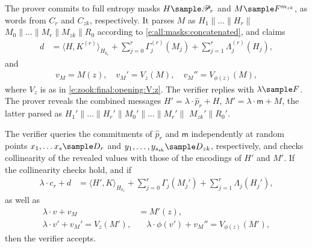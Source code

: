 \begin{protocol}
\label{prot:zook:final:opening}
The prover commits to full entropy masks $H \sample \mathscr P_r$ and $M\sample F^{m_{zk}}$, as words from $C_r$ and $C_{zk}$, respectively.
It parses $M$ as $H_1\|\ldots\|H_r\|$ $M_0 \| \ldots\|M_r\|M_{zk}\|R_0$ according to \eqref{e:all:masks:concatenated}, and claims
\begin{align}
\label{e:zook:claim:H}
d  &= \langle  H, K^{(r)} \rangle_{H_{k_r}}
+ \sum_{j=0}^r \Gamma_j^{(r)}(M_j) + \sum_{j=1}^r \Lambda_j^{(r)}(H_j),
\end{align}
and
\begin{align}
v_{M} = M(z), 
\quad
v_{M}' = V_{z}(M), 
\quad
v_M'' = V_{\phi(z)}(M),
\end{align}
where $V_z$ is as in \eqref{e:zook:final:opening:V:z}.
The verifier replies with $\lambda\sample F$.
The prover reveals the combined messages $H' = \lambda\cdot \hat p_r + H$, $M' = \lambda\cdot \mathsf m + M$, the latter parsed as $H_1'\|\ldots\|H_r'\|M_0'\|\ldots\|M_r'\|$ $M_{zk}'\|R_0'$.

The verifier queries the commitments of $\hat p_r$ and $\mathsf m$ independently at random points $x_{1}, \ldots x_{s}\sample D_r$ and $y_1,\ldots, y_{s_\text{zk}}\sample D_{zk}$, respectively, and checks collinearity of the revealed values with those of the encodings of $H'$ and $M'$. 
If the collinearity checks hold, and if 
\begin{align}
\label{e:zook:claim:combined}
\lambda \cdot c_r + d  &= \langle  H', K \rangle_{H_{k_r}}
+ \sum_{j=0}^r \Gamma_j(M_j') + \sum_{j=1}^r \Lambda_j(H_j'),
\end{align}
as well as
\begin{align}
\lambda \cdot v + v_M &=  M'(z),
\\
\lambda\cdot v'  + v_M' = V_z(M'),
&\quad \lambda\cdot \phi(v') + v_M'' = V_{\phi(z)}(M'),
\end{align}
then the verifier accepts.
\end{protocol}

